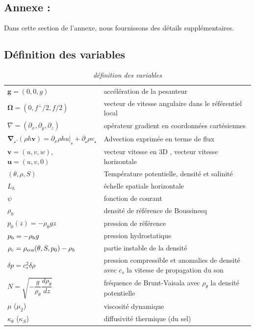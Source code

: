 \documentclass{rapportECC}
\begin{document}
\newpage



\newpage
\begin{appendices}
\section{Annexe : }
Dans cette section de l'annexe, nous fournissons des détails supplémentaires.
\subsection{Définition des variables}
{\renewcommand{\arraystretch}{1.5}
\begin{table}
\begin{center}
\begin{tabular}{ l l }
\hline 
$\mathbf{g} = (0,0,g)$ &  accélération de la pesanteur \\
$\boldsymbol{\Omega} = (0,f^\perp/2,f/2)$ & vecteur de vitesse angulaire dans le référentiel local \\
$\nabla = (\partial_x, \partial_y, \partial_z)$ & opérateur gradient en coordonnées cartésiennes\\
$\mathbf{\nabla}_{\mathscr{s}}.(\rho h \mathbf{v})= \partial_{x} \rho h u \big\vert_\mathscr{s}+\partial_\mathscr{s}\rho v_\mathscr{s}$ & Advection exprimée en terme de flux  \\
\hline
$\mathbf{v} = (u,v,w)$, $\mathbf{u} = (u,v,0)$  & vecteur vitesse en 3D , vecteur vitesse horizontale  \\ 
$(\theta,\rho,S)$ & Température potentielle, densité et salinité \\
$L_h$ & échelle spatiale horizontale \\
$\psi$ & fonction de courant \\
$\rho_0$  &  densité de référence de Boussinesq \\
$p_0(z) = - \rho_0 g z$ & pression de référence   \\
$p_{\rm h}=-\rho_{\rm h} g$  & pression hydrostatique\\
$\rho_{\rm c} = \rho_{\rm eos}(\theta,S,p_0)-\rho_h$  & partie instable de la densité \\
$\delta p=c_s^2\delta\rho$  & pression compressible et anomalies de densité avec $c_s$ la vitesse de propagation du son \\
$N = \sqrt{-\dfrac{g}{\rho_{\theta}}\dfrac{d\rho_{\theta}}{dz}}$ & fréquence de Brunt-Vaisala avec $\rho_{\theta}$ la densité potentielle \\
\hline
$\mu$ ($\mu_2$)  & viscosité dynamique \\
$\kappa_\theta$ ($\kappa_S$) & diffusivité thermique (du sel)\\
\hline 
\end{tabular}
\end{center}
\caption{\textit{définition des variables}}
\label{Table_notations}
\end{table}
}


\end{appendices}
\end{document}
